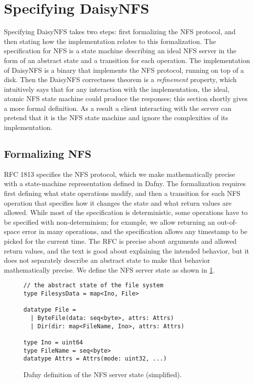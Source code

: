 \section{Specifying DaisyNFS}%
\label{sec:daisy:spec}

Specifying DaisyNFS takes two steps: first formalizing the NFS protocol, and
then stating how the implementation relates to this formalization.
The specification for NFS is a state machine describing an ideal NFS server in
the form of an abstract state and a transition for each operation. The
implementation of DaisyNFS is a binary  that implements the NFS
protocol, running on top of a
disk. Then the DaisyNFS correctness
theorem is a \emph{refinement} property, which intuitively says that
for any interaction with the
implementation, the ideal, atomic NFS state machine could produce the responses;
this section shortly gives a more formal definition.
As a result a client interacting with the server can pretend
that it is the NFS state machine and ignore the complexities of its
implementation.

\subsection{Formalizing NFS}%
\label{sec:daisy:nfs}

RFC 1813 specifies the NFS protocol, which we make mathematically precise with a
state-machine representation defined in Dafny.
The formalization requires first
defining what state operations modify, and then a transition for each
NFS operation that specifies how it changes the state and what return
values are allowed. While most of the specification is deterministic,
some operations have to be specified with non-determinism; for
example, we allow returning an out-of-space error in many operations,
and the specification allows any timestamp to be picked for the
current time. The RFC is precise about arguments and allowed return
values, and the text is good about explaining the intended behavior,
but it does not separately describe an abstract state to make that behavior
mathematically precise.  We define
the NFS server state as shown in \cref{fig:dafny-state}.

\begin{figure}[ht!]
\begin{verbatim}
// the abstract state of the file system
type FilesysData = map<Ino, File>

datatype File =
  | ByteFile(data: seq<byte>, attrs: Attrs)
  | Dir(dir: map<FileName, Ino>, attrs: Attrs)

type Ino = uint64
type FileName = seq<byte>
datatype Attrs = Attrs(mode: uint32, ...)
\end{verbatim}
\caption{Dafny definition of the NFS server state (simplified).}
\label{fig:dafny-state}
\end{figure}

